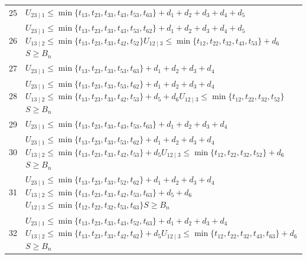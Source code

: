 \documentclass[a4paper,11pt]{amsart}
\numberwithin{equation}{section}
\theoremstyle{definition}
\theoremstyle{remark}
\begin{document}
{\begin{longtable}{@{}r>{\raggedright\arraybackslash}p{12.9cm}@{}}
25 & \(U_{23\mid 1}\leq \min\{t_{13},t_{23},t_{33},t_{43},t_{53},t_{63}\}+d_{1}+d_{2}+d_{3}+d_{4}+d_{5}\)\\[3pt]
26 & \(U_{23\mid 1}\leq \min\{t_{13},t_{23},t_{33},t_{43},t_{53},t_{62}\}+d_{1}+d_{2}+d_{3}+d_{4}+d_{5}\)\newline \(U_{13\mid 2}\leq \min\{t_{13},t_{23},t_{33},t_{42},t_{52}\}\)\newline \(U_{12\mid 3}\leq \min\{t_{12},t_{22},t_{32},t_{43},t_{53}\}+d_{6}\)\newline \(S\geq B_n\)\\[3pt]
27 & \(U_{23\mid 1}\leq \min\{t_{13},t_{23},t_{33},t_{53},t_{63}\}+d_{1}+d_{2}+d_{3}+d_{4}\)\\[3pt]
28 & \(U_{23\mid 1}\leq \min\{t_{13},t_{23},t_{33},t_{53},t_{62}\}+d_{1}+d_{2}+d_{3}+d_{4}\)\newline \(U_{13\mid 2}\leq \min\{t_{13},t_{23},t_{33},t_{42},t_{53}\}+d_{5}+d_{6}\)\newline \(U_{12\mid 3}\leq \min\{t_{12},t_{22},t_{32},t_{52}\}\)\newline \(S\geq B_n\)\\[3pt]
29 & \(U_{23\mid 1}\leq \min\{t_{13},t_{23},t_{33},t_{43},t_{53},t_{63}\}+d_{1}+d_{2}+d_{3}+d_{4}\)\\[3pt]
30 & \(U_{23\mid 1}\leq \min\{t_{13},t_{23},t_{33},t_{53},t_{62}\}+d_{1}+d_{2}+d_{3}+d_{4}\)\newline \(U_{13\mid 2}\leq \min\{t_{13},t_{23},t_{33},t_{42},t_{53}\}+d_{5}\)\newline \(U_{12\mid 3}\leq \min\{t_{12},t_{22},t_{32},t_{52}\}+d_{6}\)\newline \(S\geq B_n\)\\[3pt]
31 & \(U_{23\mid 1}\leq \min\{t_{13},t_{23},t_{33},t_{52},t_{62}\}+d_{1}+d_{2}+d_{3}+d_{4}\)\newline \(U_{13\mid 2}\leq \min\{t_{13},t_{23},t_{33},t_{42},t_{53},t_{63}\}+d_{5}+d_{6}\)\newline \(U_{12\mid 3}\leq \min\{t_{12},t_{22},t_{32},t_{53},t_{63}\}\)\newline \(S\geq B_n\)\\[3pt]
32 & \(U_{23\mid 1}\leq \min\{t_{13},t_{23},t_{33},t_{43},t_{52},t_{63}\}+d_{1}+d_{2}+d_{3}+d_{4}\)\newline \(U_{13\mid 2}\leq \min\{t_{13},t_{23},t_{33},t_{42},t_{62}\}+d_{5}\)\newline \(U_{12\mid 3}\leq \min\{t_{12},t_{22},t_{32},t_{43},t_{63}\}+d_{6}\)\newline \(S\geq B_n\)\\[3pt]

\end{longtable}}
\end{document}
